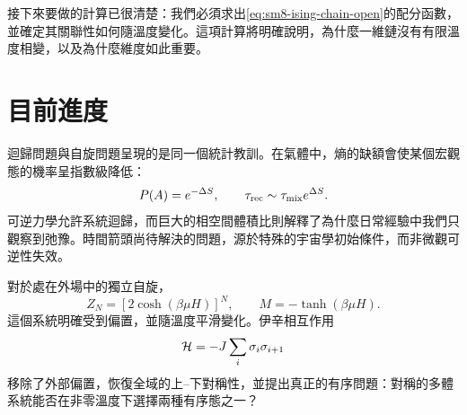 接下來要做的計算已很清楚：我們必須求出\eqref{eq:sm8-ising-chain-open}的配分函數，並確定其關聯性如何隨溫度變化。這項計算將明確說明，為什麼一維鏈沒有有限溫度相變，以及為什麼維度如此重要。

\section{目前進度}

迴歸問題與自旋問題呈現的是同一個統計教訓。在氣體中，熵的缺額會使某個宏觀態的機率呈指數級降低：
\begin{equation}
 P(A)=e^{-\Delta S},
 \qquad
 \tau_{\rm rec}\sim\tau_{\rm mix}e^{\Delta S}.
 \label{eq:sm8-summary-recurrence}
\end{equation}
可逆力學允許系統迴歸，而巨大的相空間體積比則解釋了為什麼日常經驗中我們只觀察到弛豫。時間箭頭尚待解決的問題，源於特殊的宇宙學初始條件，而非微觀可逆性失效。

對於處在外場中的獨立自旋，
\begin{equation}
 Z_N=\left[2\cosh(\beta\mu H)\right]^N,
 \qquad
 M=-\tanh(\beta\mu H).
 \label{eq:sm8-summary-spins}
\end{equation}
這個系統明確受到偏置，並隨溫度平滑變化。伊辛相互作用
\begin{equation}
 {\cal H}=-J\sum_i\sigma_i\sigma_{i+1}
 \label{eq:sm8-summary-ising}
\end{equation}
移除了外部偏置，恢復全域的上--下對稱性，並提出真正的有序問題：對稱的多體系統能否在非零溫度下選擇兩種有序態之一？
